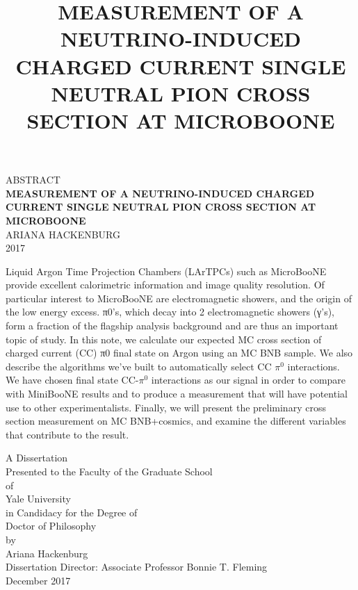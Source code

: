 \documentclass[12pt]{article}
\begin{document}
\begin{center}
{\footnotesize ABSTRACT}\\
\vspace{4 mm}
{\large \textbf{MEASUREMENT OF A NEUTRINO-INDUCED CHARGED CURRENT SINGLE NEUTRAL PION CROSS SECTION AT MICROBOONE}}\\
\vspace{6 mm}
{\footnotesize ARIANA HACKENBURG\\
2017\\}
\end{center}
Liquid Argon Time Projection Chambers (LArTPCs) such as MicroBooNE provide excellent calorimetric information and image quality resolution. Of particular interest to MicroBooNE are electromagnetic showers, and the origin of the low energy excess. π0’s, which decay into 2 electromagnetic showers (γ’s), form a fraction of the flagship analysis background and are thus an important topic of study. In this note, we calculate our expected MC cross section of charged current (CC) π0 final state on Argon using an MC BNB sample. We also describe the algorithms we’ve built to automatically select CC $\pi^0$ interactions. We have chosen final state CC-$\pi^0$ interactions as our signal in order to compare with MiniBooNE results and to produce a measurement that will have potential use to other experimentalists. Finally, we will present the preliminary cross section measurement on MC BNB+cosmics, and examine the different variables that contribute to the result.
\thispagestyle{empty}
\clearpage

\singlespacing
\title{MEASUREMENT OF A NEUTRINO-INDUCED CHARGED CURRENT SINGLE NEUTRAL PION CROSS SECTION AT MICROBOONE}
\date{}
\maketitle

\vspace{4 cm}

\begin{center}
A Dissertation \\
Presented to the Faculty of the Graduate School \\
of \\
Yale University \\
in Candidacy for the Degree of \\
Doctor of Philosophy\\ 

\vspace{6 cm}
by \\
Ariana Hackenburg \\
\vspace{3 mm}
Dissertation Director: Associate Professor Bonnie T. Fleming \\
\vspace{3 mm}
December 2017 \\ %
\end{center}
\thispagestyle{empty}
\end{document}
